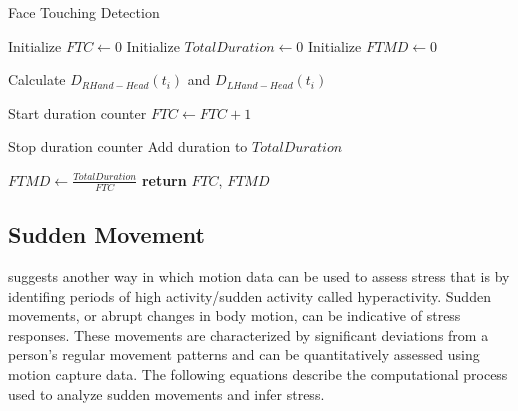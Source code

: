     \begin{algorithm}
        \caption{Face Touching Detection}
          \label{alg:face_touching}
        \begin{algorithmic}[1]
          \Statex
            \State Initialize $FTC \gets 0$ 
            \State Initialize $TotalDuration \gets 0$ 
            \State Initialize $FTMD \gets 0$ 
            
              \State Calculate $D_{RHand-Head}(t_i)$ and $D_{LHand-Head}(t_i)$
              
                \State Start duration counter
                \State $FTC \gets FTC + 1$
              \EndIf
              
                \State Stop duration counter
                \State Add duration to $TotalDuration$
              \EndIf
            \EndFor
            
                \State $FTMD \gets \frac{TotalDuration}{FTC}$ 
            \EndIf
            \State \textbf{return} $FTC$, $FTMD$
          \EndFunction
        \end{algorithmic}
      \end{algorithm}

      
\subsection*{Sudden Movement }
\label{subsec:sudden_movement_analysis}

\textcite{hyperactivity} suggests another way in which motion data can be used to assess stress that is by identifing periods of
high activity/sudden activity called hyperactivity.
Sudden movements, or abrupt changes in body motion, can be indicative of stress responses. These movements are characterized by significant deviations from a person's regular movement patterns and can be quantitatively assessed using motion capture data. The following equations describe the computational process used to analyze sudden movements and infer stress.

